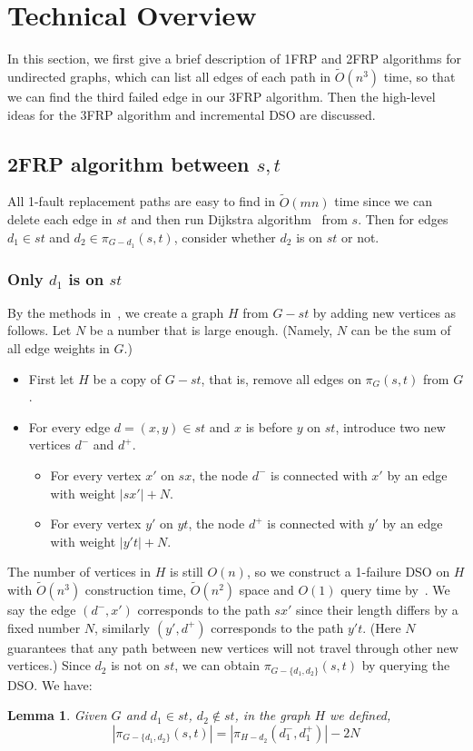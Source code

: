 \documentclass[11pt]{article}
\theoremstyle{plain}
\newtheorem{lemma}[theorem]{Lemma}
\theoremstyle{definition}
\newcommand{\set}[1]{\{ #1 \}}
\newcommand{\og}[3]{\pi_{G-#3}\left(#1,#2\right)}
\newcommand{\hg}[3]{\pi_{H-#3}\left(#1,#2\right)}
\begin{document}
 \section{Technical Overview}\label{sec:overview}

In this section, we first give a brief description of 1FRP and 2FRP algorithms for undirected graphs, which can list all edges of each path in $\tilde{O}(n^3)$ time, so that we can find the third failed edge in our 3FRP algorithm. Then the high-level ideas for the 3FRP algorithm and incremental DSO are discussed. 

\subsection{2FRP algorithm between $s,t$}\label{sec:2FRP}

All 1-fault replacement paths are easy to find in $\tilde{O}(mn)$ time since we can delete each edge in $st$ and then run Dijkstra algorithm~\cite{Dij59} from $s$. Then for edges $d_1\in st$ and $d_2\in \og{s}{t}{d_1}$, consider whether $d_2$ is on $st$ or not.

\subsubsection{Only $d_1$ is on $st$}\label{sec:one-2FRP}

By the methods in~\cite{WWX22}, we create a graph $H$ from $G-st$ by adding new vertices as follows. Let $N$ be a number that is large enough. (Namely, $N$ can be the sum of all edge weights in $G$.)
\begin{itemize}
    \item First let $H$ be a copy of $G-st$, that is, remove all edges on $\pi_G(s,t)$ from $G$.
    \item For every edge $d=(x,y)\in st$ and $x$ is before $y$ on $st$, introduce two new vertices $d^-$ and $d^+$. 
    \begin{itemize}
        \item For every vertex $x'$ on $sx$, the node $d^-$ is connected with $x'$ by an edge with weight $|sx'|+N$.
        \item For every vertex $y'$ on $yt$, the node $d^+$ is connected with $y'$ by an edge with weight $|y't|+N$.
    \end{itemize}
\end{itemize}

The number of vertices in $H$ is still $O(n)$, so we construct a 1-failure DSO on $H$ with $\tilde{O}(n^3)$ construction time, $\tilde{O}(n^2)$ space and $O(1)$ query time by~\cite{2009A}. We say the edge $(d^-,x')$ corresponds to the path $sx'$ since their length differs by a fixed number $N$, similarly $(y',d^+)$ corresponds to the path $y't$. (Here $N$ guarantees that any path between new vertices will not travel through other new vertices.) Since $d_2$ is not on $st$, we can obtain $\og{s}{t}{\set{d_1,d_2}}$ by querying the DSO. We have:
\begin{lemma} \label{lemma:1edge}
    Given $G$ and $d_1\in st$, $d_2\notin st$, in the graph $H$ we defined,
    $$ |\og{s}{t}{\set{d_1, d_2}}| = |\hg{d_1^-}{d_1^+}{d_2}| - 2N$$
\end{lemma}
\end{document}
